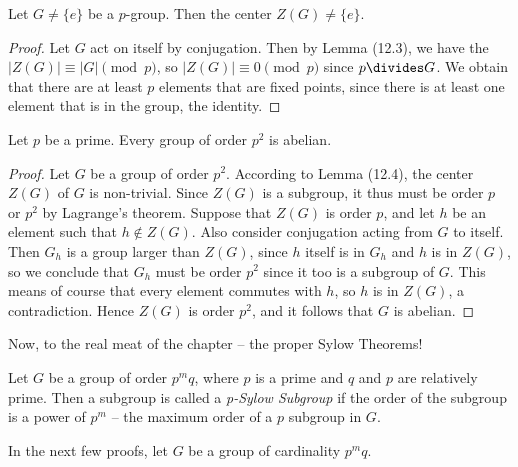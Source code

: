 \begin{lemma}
    Let $G \neq \{e\}$ be a $p$-group. Then the center $Z(G) \neq \{e\}$.
\end{lemma}
\begin{proof}
    Let $G$ act on itself by conjugation. Then by Lemma (12.3), we have the $|Z(G)| \equiv |G| \pmod{p}$, so $|Z(G)| \equiv 0 \pmod{p}$ since $p \divides G$. We obtain that there are at least $p$ elements that are fixed points, since there is at least one element that is in the group, the identity.
\end{proof}

\begin{corollary}
    Let $p$ be a prime. Every group of order $p^2$ is abelian.
\end{corollary}
\begin{proof}
    Let $G$ be a group of order $p^2$. According to Lemma (12.4), the center $Z(G)$ of $G$ is non-trivial. Since $Z(G)$ is a subgroup, it thus must be order $p$ or $p^2$ by Lagrange's theorem. Suppose that $Z(G)$ is order $p$, and let $h$ be an element such that $h \notin Z(G)$. Also consider conjugation acting from $G$ to itself. Then $G_h$ is a group larger than $Z(G)$, since $h$ itself is in $G_h$ and $h$ is in $Z(G)$, so we conclude that $G_h$ must be order $p^2$ since it too is a subgroup of $G$. This means of course that every element commutes with $h$, so $h$ is in $Z(G)$, a contradiction. Hence $Z(G)$ is order $p^2$, and it follows that $G$ is abelian.
\end{proof}

Now, to the real meat of the chapter -- the proper Sylow Theorems!

Let $G$ be a group of order $p^mq$, where $p$ is a prime and $q$ and $p$ are relatively prime. Then a subgroup is called a \emph{p-Sylow Subgroup}  if the order of the subgroup is a power of $p^m$ -- the maximum order of a $p$ subgroup in $G$.

In the next few proofs, let $G$ be a group of cardinality $p^mq$.

